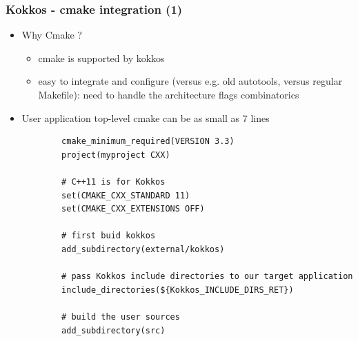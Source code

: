 \begin{frame}[fragile=singleslide]
  \frametitle{Kokkos - cmake integration (1)}

  \begin{itemize}
  \item Why Cmake ?
    \begin{itemize}
    \item cmake is supported by kokkos
    \item easy to integrate and configure (versus e.g. old autotools, versus regular Makefile): need to handle the architecture flags combinatorics
    \end{itemize}
  \item User application top-level cmake can be as small as 7 lines
    {\small
      \begin{verbatim}
        cmake_minimum_required(VERSION 3.3)
        project(myproject CXX)
        
        # C++11 is for Kokkos
        set(CMAKE_CXX_STANDARD 11)
        set(CMAKE_CXX_EXTENSIONS OFF)
        
        # first buid kokkos
        add_subdirectory(external/kokkos)
        
        # pass Kokkos include directories to our target application
        include_directories(${Kokkos_INCLUDE_DIRS_RET})
        
        # build the user sources
        add_subdirectory(src)
      \end{verbatim}
      }
  \end{itemize}
  
\end{frame}


